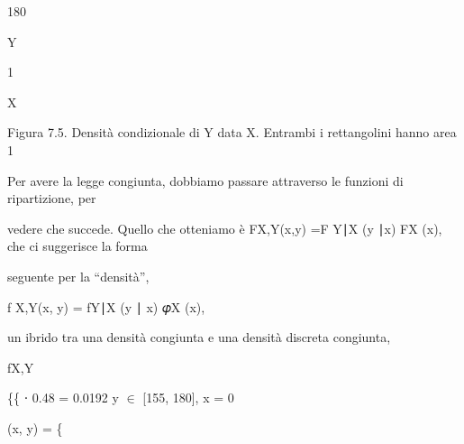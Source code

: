 \documentclass[a4paper,portrait,12pt]{article}
\begin{document}
180





\begin{flushleft}
Y
\end{flushleft}





1


\begin{flushleft}
X
\end{flushleft}


\begin{flushleft}
Figura 7.5. Densit\`{a} condizionale di Y data X. Entrambi i rettangolini hanno area 1
\end{flushleft}





\begin{flushleft}
Per avere la legge congiunta, dobbiamo passare attraverso le funzioni di ripartizione, per
\end{flushleft}


\begin{flushleft}
vedere che succede. Quello che otteniamo \`{e} FX,Y(x,y) =F Y∣X (y ∣x) FX (x), che ci suggerisce la forma
\end{flushleft}


\begin{flushleft}
seguente per la {``}densit\`{a}'',
\end{flushleft}


\begin{flushleft}
f X,Y(x, y) = fY∣X (y ∣ x) 𝜑X (x),
\end{flushleft}


\begin{flushleft}
un ibrido tra una densit\`{a} congiunta e una densit\`{a} discreta congiunta,
\end{flushleft}


\begin{flushleft}
fX,Y
\end{flushleft}





\begin{flushleft}
\{\{ ⋅ 0.48 = 0.0192 y $\in$ [155, 180], x = 0
\end{flushleft}


\begin{flushleft}
(x, y) = \{
\end{flushleft}
\end{document}
